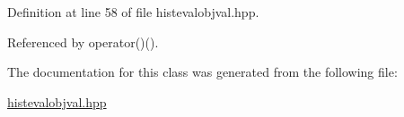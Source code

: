\-Definition at line 58 of file histevalobjval.\-hpp.



\-Referenced by operator()().



\-The documentation for this class was generated from the following file\-:\begin{DoxyCompactItemize}
\item 
\hyperlink{histevalobjval_8hpp}{histevalobjval.\-hpp}\end{DoxyCompactItemize}
